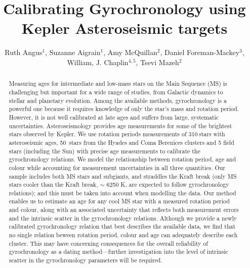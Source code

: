 \documentclass[10pt,preprint]{aastex}
\newcommand{\nastero}{310}
\newcommand{\nHC}{50~}
\begin{document}
\title{Calibrating Gyrochronology using Kepler Asteroseismic targets}

\author{Ruth Angus$^1$, Suzanne Aigrain$^1$, Amy McQuillan$^2$, Daniel Foreman-Mackey$^3$,  William, J. Chaplin$^{4, 5}$, Tsevi Mazeh$^2$}

\begin{abstract}
\label{abs}

Measuring ages for intermediate and low-mass stars on the Main Sequence (MS) is challenging but important for a wide range of studies, from Galactic dynamics to stellar and planetary evolution.
Among the available methods, gyrochronology is a powerful one because it requires knowledge of only the star's mass and rotation period.
However, it is not well calibrated at late ages and suffers from large, systematic uncertainties.
Asteroseismology provides age measurements for some of the brightest stars observed by Kepler.
We use rotation periods measurements of \nastero$~$stars with asteroseismic ages, \nHC stars from the Hyades and Coma Berenices clusters and 5 field stars (including the Sun) with precise age measurements to calibrate the gyrochronology relations.
We model the relationship between rotation period, age and colour while accounting for measurement uncertainties in all three quantities.
Our sample includes both MS stars and subgiants, and straddles the Kraft break (only MS stars cooler than the Kraft break, $\sim$ 6250 K, are expected to follow gyrochronology relations); and this must be taken into account when modelling the data.
Our method enables us to estimate an age for any cool MS star with a measured rotation period and colour, along with an associated uncertainty that reflects both measurement errors and the intrinsic scatter in the gyrochronology relations.
Although we provide a newly calibrated gyrochronology relation that best describes the available data, we find that no single relation beween rotation period, colour and age can adequately describe each cluster.
This may have concerning consequences for the overall reliability of gyrochronology as a dating method---further investigation into the level of intrinsic scatter in the gyrochronology parameters will be required.

\end{abstract}
\end{document}

